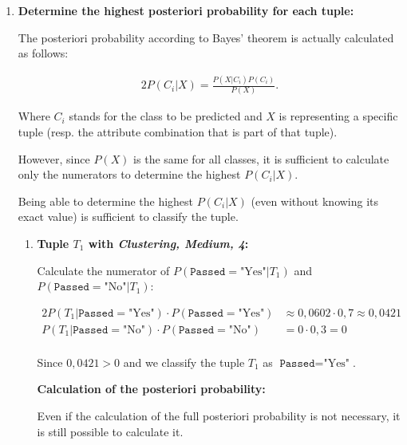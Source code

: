 \documentclass[
english,
smallborders
]{i6prcsht}
\newcommand{\BayesNumerator}[3]{P(#1 | \texttt{#2}=\text{"#3"}) \cdot P(\texttt{#2}=\text{"#3"})}
\newcommand{\PosterioriProbability}[3]{P(\texttt{#2}=\text{"#3"} | #1)}
\newcommand{\ResultClass}[2]{\texttt{#1}=\text{"#2"}}
\begin{document}
\begin{solution}
\begin{enumerate}
		\item \textbf{Determine the highest posteriori probability for each tuple:}

		      The posteriori probability according to Bayes' theorem is actually calculated as follows:

		      \begin{alignat*}{2}
			      P(C_i|X) = \frac{P(X|C_i)P(C_i)}{P(X)}.
		      \end{alignat*}

		      Where $C_i$ stands for the class to be predicted and $X$ is representing a specific tuple (resp. the attribute combination that is part of that tuple).

		      However, since $P(X)$ is the same for all classes, it is sufficient to calculate only the numerators to determine the highest $P(C_i|X)$.

		      Being able to determine the highest $P(C_i|X)$ (even without knowing its exact value) is sufficient to classify the tuple.

		      \begin{enumerate}
			      \item \textbf{Tuple $T_1$ with \textit{Clustering, Medium, 4}:}

			            Calculate the numerator of $\PosterioriProbability{T_1}{Passed}{Yes}$ and $\PosterioriProbability{T_1}{Passed}{No}$:

			            \begin{alignat*}{2}
				            \BayesNumerator{T_1}{Passed}{Yes} & \approx 0,0602 \cdot 0,7 \approx 0,0421 \\
				            \BayesNumerator{T_1}{Passed}{No}  & = 0 \cdot 0,3 = 0                       \\
			            \end{alignat*}

			            Since $0,0421 > 0$ and we classify the tuple $T_1$ as $\ResultClass{Passed}{Yes}$.

			            \vspace*{3em}

			            \begin{mdframed}[linecolor=solutioncolor]
				            \color{solutioncolor}
				            \begin{em}
					            \textbf{Calculation of the posteriori probability:}

					            Even if the calculation of the full posteriori probability is not necessary, it is still possible to calculate it.


\end{em}
\end{mdframed}
\end{enumerate}
\end{enumerate}
\end{solution}
\end{document}
